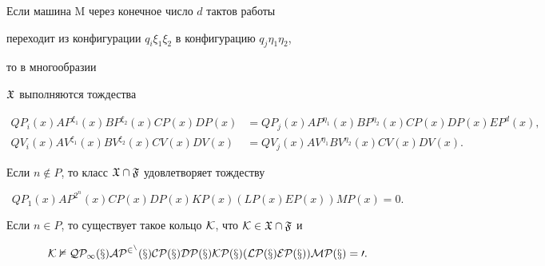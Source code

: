  


\begin{lem} 


Если машина $\mathrm M$ через конечное число $d$ тактов работы 


переходит из конфигурации $q_i\xi_1\xi_2$ в конфигурацию $q_j\eta_1\eta_2$, 


то в многообразии 


$\frak X$ выполняются тождества 


\begin{align*} 


QP_i(x)AP^{\xi_1}(x)BP^{\xi_2}(x)CP(x)DP(x)&= 


QP_j(x)AP^{\eta_1}(x)BP^{\eta_2}(x)CP(x)DP(x)EP^d(x), \\ 


QV_i(x)AV^{\xi_1}(x)BV^{\xi_2}(x)CV(x)DV(x)&= 


QV_j(x)AV^{\eta_1}BV^{\eta_2}(x)CV(x)DV(x). 


\end{align*} 


\end{lem} 


 


\begin{lem} 


Если $n\notin P$, то класс $\frak X\cap\frak F$ удовлетворяет тождеству 


$$ 


QP_1(x)AP^{2^n}(x)CP(x)DP(x) 


KP(x)(LP(x)EP(x))MP(x)=0. 


$$ 


\end{lem} 


 


\begin{lem} 


Если $n\in P$, то существует такое кольцо $\cal K$, что $\cal K\in\frak X\cap 


\frak F$ и 


$$ 


\cal K\nvDash QP_1(x)AP^{2^n}(x)CP(x)DP(x)KP(x) 


(LP(x)EP(x))MP(x)=0. 


$$ 


\end{lem} 


 


 


